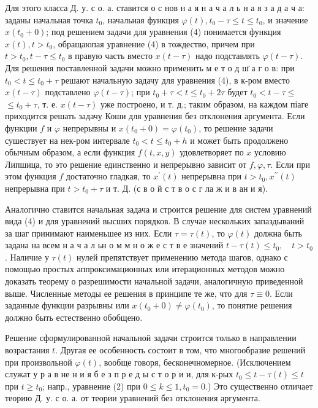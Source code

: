 \documentclass[10pt]{article}
\begin{document}
Для этого класса Д. у. с о. а. ставится о с нов н а я н а ч а л ь н а я з а д а ч а: заданы начальная точка $t_{0}$, начальная функция $\varphi(t), t_{0}-\tau \leqslant t \leqslant t_{0}$, и значение $x\left(t_{0}+0\right)$; под решением задачи для уравнения (4) понимается функция $x(t), t>t_{0}$, обращаюпая уравнение (4) в тождество, причем при $t>t_{0}, t-\tau \leqslant t_{0}$ в правую часть вместо $x(t-\tau)$ надо подставлять $\varphi(t-\tau)$. Для решения поставленной задачи можно применить м е т о д ш̈ а г о в: при $t_{0}<t \leqslant t_{0}+\tau$ решают начальную задачу для уравнения (4), в к-ром вместо $x(t-\tau)$ подставлено $\varphi(t-\tau)$; при $t_{0}+\tau<t \leqslant t_{0}+2 \tau$ будет $t_{0}<t-\tau \leqslant$ $\leqslant t_{0}+\tau$, т. е. $x(t-\tau)$ уже построено, и т. д.; таким образом, на каждом піаге приходится решать задачу Коши для уравнения без отклонения аргумента. Если функции $f$ и $\varphi$ непрерывны и $x\left(t_{0}+0\right)=\varphi\left(t_{0}\right)$, то решение задачи сушествует на нек-ром интервале $t_{0}<t \leqslant t_{0}+h$ и может быть продолжено обычным образом, а если функция $f(t, x, y)$ удовлетворяет по $x$ условию Липшица, то это решение единственно и непрерывно зависит от $f, \varphi, \tau$. Если при этом функция $f$ достаточно гладкая, то $x^{\prime}(t)$ непрерывна при $t>t_{0}, x^{\prime \prime}(t)$ непрерывна при $t>t_{0}+\tau$ и т. Д. (с в о й с т в о с г ла ж и в ан и я).



Аналогично ставится начальная задача и строится решение для систем уравнений вида (4) и для уравнений высших порядков. В случае нескольких запаздываний за шаг принимают наименьшее из них. Если $\tau=\tau(t)$, то $\varphi(t)$ должна быть задана на всем н а ч а л ьн о м м н о ж е с т в е значений $t-\tau(t) \leqslant t_{0}, \quad t>t_{0}$. Наличие у $\tau(t)$ нулей препятствует применению метода шагов, однако с помощью простых аппроксимационных или итерационных методов можно доказать теорему о разрешимости начальной задачи, аналогичную приведенной выше. Численные методы ее решения в принципе те же, что для $\tau \equiv 0$. Если заданные функции разрывны или $x\left(t_{0}+0\right) \neq \varphi\left(t_{0}\right)$, то понятие решения должно быть естественно обобщено.



Решение сформулированной начальной задачи строится только в направлении возрастания $t$. Другая ее особенность состоит в том, что многообразие решений при произвольной $\varphi(t)$, вообще говоря, бесконечномерное. (Исключением служат у р а в не н и я б е з п р е д ы с т о р и и, для к-рых $t_{0} \leqslant t-\tau(t) \leqslant t$ при $t \geqslant t_{0}$; напр., уравнение (2) при $0 \leqslant k \leqslant 1, t_{0}=0$.) Это существенно отличает теорию Д. у. с о. а. от теории уравнений без отклонения аргумента.
\end{document}

